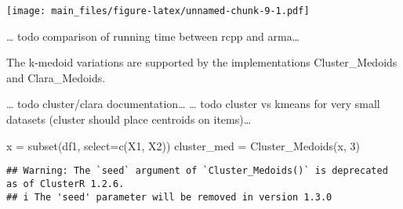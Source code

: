 \documentclass[
]{article}
\newenvironment{Shaded}{\begin{snugshade}}{\end{snugshade}}
\newcommand{\AttributeTok}[1]{\textcolor[rgb]{0.77,0.63,0.00}{#1}}
\newcommand{\DecValTok}[1]{\textcolor[rgb]{0.00,0.00,0.81}{#1}}
\newcommand{\FunctionTok}[1]{\textcolor[rgb]{0.00,0.00,0.00}{#1}}
\newcommand{\NormalTok}[1]{#1}
\newcommand{\OtherTok}[1]{\textcolor[rgb]{0.56,0.35,0.01}{#1}}
\begin{document}
\texttt{[image: main\_files/figure-latex/unnamed-chunk-9-1.pdf]}

\ldots{} todo comparison of running time between rcpp and arma\ldots{}

The k-medoid variations are supported by the implementations
Cluster\_Medoids and Clara\_Medoids.

\ldots{} todo cluster/clara documentation\ldots{} \ldots{} todo cluster
vs kmeans for very small datasets (cluster should place centroids on
items)\ldots{}

\begin{Shaded}
\begin{Highlighting}[]
\NormalTok{x }\OtherTok{=} \FunctionTok{subset}\NormalTok{(df1, }\AttributeTok{select=}\FunctionTok{c}\NormalTok{(X1, X2))}
\NormalTok{cluster\_med }\OtherTok{=} \FunctionTok{Cluster\_Medoids}\NormalTok{(x, }\DecValTok{3}\NormalTok{)          }
\end{Highlighting}
\end{Shaded}

\begin{verbatim}
## Warning: The `seed` argument of `Cluster_Medoids()` is deprecated as of ClusterR 1.2.6.
## i The 'seed' parameter will be removed in version 1.3.0
\end{verbatim}
\end{document}
